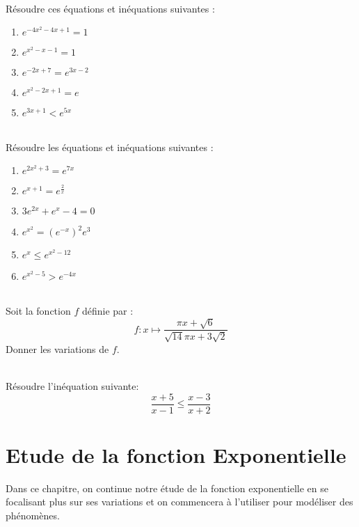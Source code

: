 \documentclass[12pt,fleqn]{report} %
\begin{document}
\begin{exercise}\label{Exercice 17}\text{ }\\
	Résoudre ces équations et inéquations suivantes : 
	
	\begin{enumerate}
		\item $e^{-4x^2-4x+1}  =1$
		\item $e^{x^2-x-1}  =1$
		\item $e^{-2x+7}  =e^{3x-2}$
		\item $e^{x^2-2x+1} =e$
		\item $e^{3x+1}  <e^{5x}$
	\end{enumerate}
\end{exercise}

\begin{exercise}\label{Exercice 18}\text{ }\\
	Résoudre les équations et inéquations suivantes : 
	\begin{enumerate}
		\item $e^{2x^2+3}=e^{7x}$
		\item $e^{x+1}=e^{\frac{2}{x}}$
		\item $3e^{2x}+e^x-4=0$
		\item $e^{x^2}=(e^{-x})^2 e^3$
		\item $e^x\leq e^{x^2-12}$
		\item $e^{x^2-5}>e^{-4x}$		
	\end{enumerate}
\end{exercise}

\begin{exercise}\label{Exercice 27}\text{ }\\
	Soit la fonction $f$ définie par :
	\begin{equation*}
	f : x \mapsto \frac{\pi x+\sqrt{6}}{\sqrt{14}\pi x+3\sqrt{2}}
	\end{equation*}
	Donner les variations de $f$.
\end{exercise}

\pagebreak
\begin{exercise}\label{Exercice 33}\text{ }\\
	Résoudre l'inéquation suivante: \[\frac{x+5}{x-1}\leq \frac{x-3}{x+2}\]
\end{exercise}


\setcounter{chapter}{2}
\chapter{Etude de la fonction Exponentielle}
Dans ce chapitre, on continue notre étude de la fonction exponentielle en se focalisant plus sur ses variations et on commencera à l'utiliser pour modéliser des phénomènes.
\end{document}
